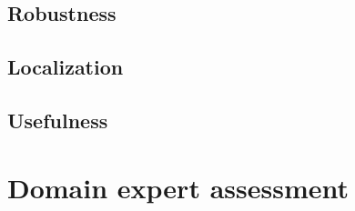 \subsection*{Robustness}

\subsection*{Localization}

\subsection*{Usefulness}

\section{Domain expert assessment}
